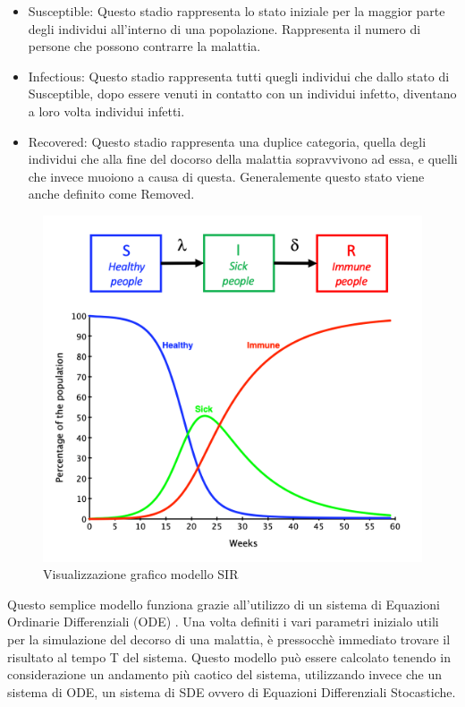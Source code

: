\begin{itemize}
    \item Susceptible: Questo stadio rappresenta lo stato iniziale per la maggior parte
    degli individui all'interno di una popolazione. Rappresenta il numero di 
    persone che possono contrarre la malattia.
    \item Infectious: Questo stadio rappresenta tutti quegli individui che dallo 
    stato di Susceptible, dopo essere venuti in contatto con un individui infetto, 
    diventano a loro volta individui infetti.
    \item Recovered: Questo stadio rappresenta una duplice categoria, quella degli
    individui che alla fine del docorso della malattia sopravvivono ad essa, e 
    quelli che invece muoiono a causa di questa. Generalemente questo stato viene
    anche definito come Removed.
\end{itemize}

\begin{figure}
    \includegraphics[width=\linewidth]{img/SIR-model.png}
    \caption{Visualizzazione grafico modello SIR} 
    \label{fig:SIR_model_graphic}
\end{figure}

Questo semplice modello funziona grazie all'utilizzo di un sistema di Equazioni
Ordinarie Differenziali (ODE) \cite{Brauer2008}. Una volta definiti i vari parametri inizialo 
utili per la simulazione del decorso di una malattia, è pressocchè immediato trovare
il risultato al tempo T del sistema. Questo modello può essere calcolato tenendo 
in considerazione un andamento più caotico del sistema, utilizzando invece che 
un sistema di ODE, un sistema di SDE \cite{Allen2008} ovvero di Equazioni Differenziali Stocastiche.

